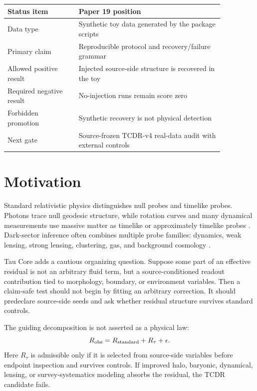 \documentclass[11pt]{article}
\begin{document}
\begin{center}
\begin{tabular}{L{0.28\linewidth}L{0.58\linewidth}}
\toprule
Status item & Paper 19 position\\
\midrule
Data type & Synthetic toy data generated by the package scripts\\
Primary claim & Reproducible protocol and recovery/failure grammar\\
Allowed positive result & Injected source-side structure is recovered in the toy\\
Required negative result & No-injection runs remain score zero\\
Forbidden promotion & Synthetic recovery is not physical detection\\
Next gate & Source-frozen TCDR-v4 real-data audit with external controls\\
\bottomrule
\end{tabular}
\end{center}

\section{Motivation}

Standard relativistic physics distinguishes null probes and timelike probes.
Photons trace null geodesic structure, while rotation curves and many dynamical
measurements use massive matter as timelike or approximately timelike probes
\cite{Einstein1905,Einstein1916}.  Dark-sector inference often combines
multiple probe families: dynamics, weak lensing, strong lensing, clustering,
gas, and background cosmology \cite{Rubin1980,Navarro1996,Mandelbaum2018}.

Tau Core adds a cautious organizing question.  Suppose some part of an
effective residual is not an arbitrary fluid term, but a source-conditioned
readout contribution tied to morphology, boundary, or environment variables.
Then a claim-safe test should not begin by fitting an arbitrary correction.
It should predeclare source-side seeds and ask whether residual structure
survives standard controls.

The guiding decomposition is not asserted as a physical law:
\begin{equation}
  R_{\rm obs}
  =
  R_{\rm standard}
  +
  R_{\tau}
  +
  \epsilon .
\end{equation}
Here \(R_{\tau}\) is admissible only if it is selected from source-side
variables before endpoint inspection and survives controls.  If improved halo,
baryonic, dynamical, lensing, or survey-systematics modeling absorbs the
residual, the TCDR candidate fails.
\end{document}

